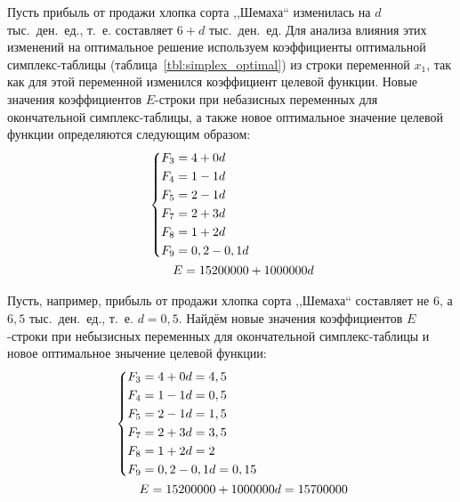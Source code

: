 Пусть прибыль от продажи хлопка сорта ,,Шемаха`` изменилась на $ d $ тыс.~ден.~ед., т.~е. составляет $ 6 + d $ тыс.~ден.~ед. Для анализа влияния этих изменений на оптимальное решение используем коэффициенты оптимальной симплекс-таблицы (таблица~\ref{tbl:simplex_optimal}) из строки переменной $ x_1 $, так как для этой переменной изменился коэффициент целевой функции. Новые значения коэффициентов $ E $-строки при небазисных переменных для окончательной симплекс-таблицы, а также новое оптимальное значение целевой функции определяются следующим образом:
\begin{equation}
\label{eq:analysis_fourth}
	\begin{aligned}
  	&\left\{
    	\begin{aligned}
	      F_3 & = 4 + 0d \\
	      F_4 & = 1 - 1d \\
	      F_5 & = 2 - 1d \\
	      F_7 & = 2 + 3d \\
	      F_8 & = 1 + 2d \\
	      F_9 & = 0,2 - 0,1d \\
    	\end{aligned}
  	\right.
  	\\
  	& \hspace{7mm} E = 15 200 000 + 1 000 000d
	\end{aligned}
\end{equation}


Пусть, например, прибыль от продажи хлопка сорта ,,Шемаха`` составляет не $ 6 $, а $ 6,5 $ тыс.~ден.~ед., т.~е. $ d = 0,5 $. Найдём новые значения коэффициентов $ E $-строки при небызисных переменных для окончательной симплекс-таблицы и новое оптимальное знычение целевой функции:
\begin{equation}
\label{eq:analysis_third_result}
	\begin{aligned}
  	&\left\{
    	\begin{aligned}
	      F_3 & = 4 + 0d = 4,5\\
	      F_4 & = 1 - 1d = 0,5\\
	      F_5 & = 2 - 1d = 1,5\\
	      F_7 & = 2 + 3d = 3,5\\
	      F_8 & = 1 + 2d = 2\\
	      F_9 & = 0,2 - 0,1d = 0,15 \\ 
    	\end{aligned}
  	\right.
  	\\
  	& \hspace{7mm} E = 15 200 000 + 1 000 000d = 15 700 000
	\end{aligned}
\end{equation}

